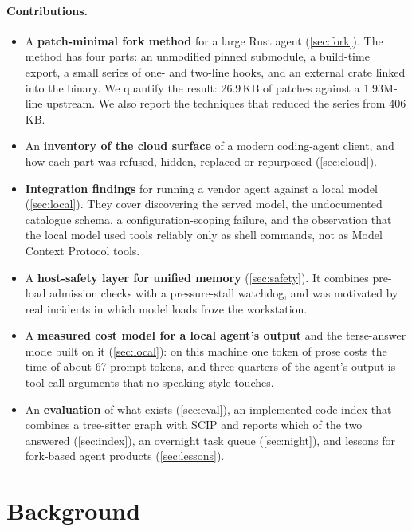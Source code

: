 \documentclass[11pt]{article}
\begin{document}
\paragraph{Contributions.}
\begin{itemize}
  \item A \textbf{patch-minimal fork method} for a large Rust agent (\cref{sec:fork}). The method has
    four parts: an unmodified pinned submodule, a build-time export, a small series of one- and
    two-line hooks, and an external crate linked into the binary. We quantify the result: 26.9\,KB
    of patches against a 1.93M-line upstream. We also report the techniques that reduced the
    series from 406\,KB.
  \item An \textbf{inventory of the cloud surface} of a modern coding-agent client, and how each part
    was refused, hidden, replaced or repurposed (\cref{sec:cloud}).
  \item \textbf{Integration findings} for running a vendor agent against a local model
    (\cref{sec:local}). They cover discovering the served model, the undocumented catalogue schema,
    a configuration-scoping failure, and the observation that the local model used tools reliably
    only as shell commands, not as Model Context Protocol tools.
  \item A \textbf{host-safety layer for unified memory} (\cref{sec:safety}). It combines pre-load
    admission checks with a pressure-stall watchdog, and was motivated by real incidents in which
    model loads froze the workstation.
  \item A \textbf{measured cost model for a local agent's output} and the terse-answer mode built on
    it (\cref{sec:local}): on this machine one token of prose costs the time of about 67 prompt
    tokens, and three quarters of the agent's output is tool-call arguments that no speaking style
    touches.
  \item An \textbf{evaluation} of what exists (\cref{sec:eval}), an implemented code index that
    combines a tree-sitter graph with SCIP and reports which of the two answered
    (\cref{sec:index}), an overnight task queue (\cref{sec:night}), and lessons for fork-based
    agent products (\cref{sec:lessons}).
\end{itemize}

\section{Background}
\end{document}
